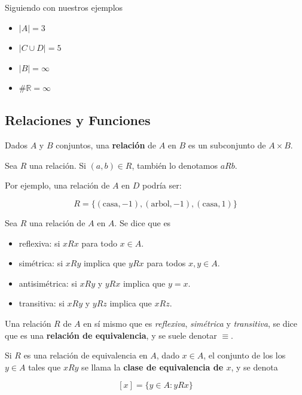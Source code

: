 \begin{example}
Siguiendo con nuestros ejemplos

\begin{itemize}
\item $ |A| = 3$
\item $ |C \cup D| = 5$
\item $ |B| = \infty $
\item $ \# \mathbb{R} = \infty$
\end{itemize}
\end{example}

\subsection{Relaciones y Funciones}

\begin{definition}[Relación] 
Dados $A$ y $B$ conjuntos, una \textbf{relación} \label{relacion} de $A$ en $B$ es un subconjunto de $A \times B$.

Sea $R$ una relación.  Si $(a,b) \in R$, también lo denotamos $a R b$.
\end{definition}

\begin{example}
Por ejemplo, una relación de $A$ en $D$ podría ser:

$$ R = \{(\textrm{casa},-1), (\textrm{arbol},-1), (\textrm{casa},1) \} $$
\end{example}

\begin{definition}
Sea $R$ una relación de $A$ en $A$.  Se dice que es

\begin{itemize}

\item reflexiva: si $xRx$ para todo $x \in A$.

\item simétrica: si $xRy$ implica que $yRx$ para todos $x,y \in A$.

\item antisimétrica: si $xRy$ y $yRx$ implica que $y=x$.

\item transitiva: si $xRy$ y $yRz$ implica que $xRz$.
\end{itemize}
\end{definition}

\begin{definition}
Una relación $R$ de $A$ en sí mismo que es \emph{reflexiva}, \emph{simétrica} y \emph{transitiva}, se dice que es una \textbf{relación de equivalencia}, y se suele denotar $\equiv$.  

Si $R$ es una relación de equivalencia en $A$, dado $x \in A$, el conjunto de los los $y \in A$ tales que $x R y$ se llama la \textbf{clase de equivalencia de $x$}, y se denota

$$[x] = \{y \in A : yRx \}$$
\end{definition}


